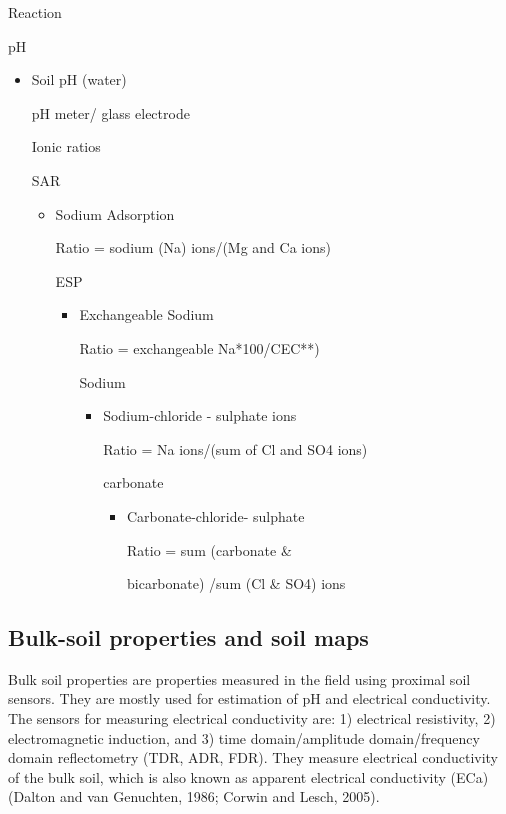\documentclass[
  10pt,
  b5paper,
]{book}
\begin{document}
Reaction

pH

\begin{itemize}
\item
  Soil pH (water)

  pH meter/ glass electrode

  Ionic ratios

  SAR

  \begin{itemize}
  \item
    Sodium Adsorption

    Ratio = sodium (Na) ions/(Mg and Ca ions)

    ESP

    \begin{itemize}
    \item
      Exchangeable Sodium

      Ratio = exchangeable Na*100/CEC**)

      Sodium

      \begin{itemize}
      \item
        Sodium-chloride - sulphate ions

        Ratio = Na ions/(sum of Cl and SO4 ions)

        carbonate

        \begin{itemize}
        \item
          Carbonate-chloride- sulphate

          Ratio = sum (carbonate \&

          bicarbonate) /sum (Cl \& SO4) ions
        \end{itemize}
      \end{itemize}
    \end{itemize}
  \end{itemize}
\end{itemize}

\hypertarget{bulk-soil-properties-and-soil-maps}{%
\subsection{Bulk-soil properties and soil maps}\label{bulk-soil-properties-and-soil-maps}}

Bulk soil properties are properties measured in the field using proximal soil sensors. They are mostly used for estimation of pH and electrical conductivity. The sensors for measuring electrical conductivity are: 1) electrical resistivity, 2) electromagnetic induction, and 3) time domain/amplitude domain/frequency domain reflectometry (TDR, ADR, FDR). They measure electrical conductivity of the bulk soil, which is also known as apparent electrical conductivity (ECa) (Dalton and van Genuchten, 1986; Corwin and Lesch, 2005).
\end{document}
